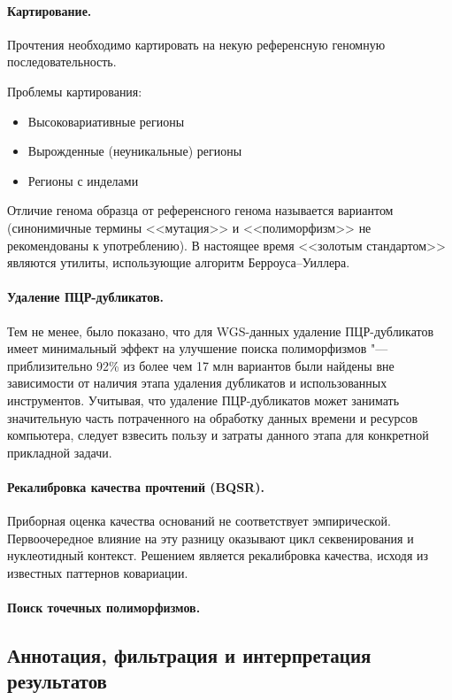 \documentclass[a4paper,12pt]{article}
\begin{document}
\paragraph{Картирование.}
Прочтения необходимо картировать на некую референсную геномную последовательность.

Проблемы картирования:

\begin{itemize}
\item Высоковариативные регионы
\item Вырожденные (неуникальные) регионы
\item Регионы с инделами
\end{itemize}

Отличие генома образца от референсного генома называется вариантом (синонимичные термины <<мутация>> и <<полиморфизм>> не рекомендованы к употреблению\cite{richards}).
В настоящее время <<золотым стандартом>> являются утилиты, использующие алгоритм Берроуса--Уиллера\cite{burrows}.

\paragraph{Удаление ПЦР-дубликатов.}
Тем не менее, было показано, что для WGS-данных удаление ПЦР-дубликатов имеет минимальный эффект на улучшение поиска полиморфизмов "--- приблизительно 92\% из более чем 17 млн вариантов были найдены вне зависимости от наличия этапа удаления дубликатов и использованных инструментов\cite{ebbert}.
Учитывая, что удаление ПЦР-дубликатов может занимать значительную часть потраченного на обработку данных времени и ресурсов компьютера, следует взвесить пользу и затраты данного этапа для конкретной прикладной задачи.

\paragraph{Рекалибровка качества прочтений (BQSR).}
Приборная оценка качества оснований не соответствует эмпирической.
Первоочередное влияние на эту разницу оказывают цикл секвенирования и нуклеотидный контекст.
Решением является рекалибровка качества, исходя из известных паттернов ковариации.

\paragraph{Поиск точечных полиморфизмов.}

\subsection{Аннотация, фильтрация и интерпретация результатов}
\end{document}
